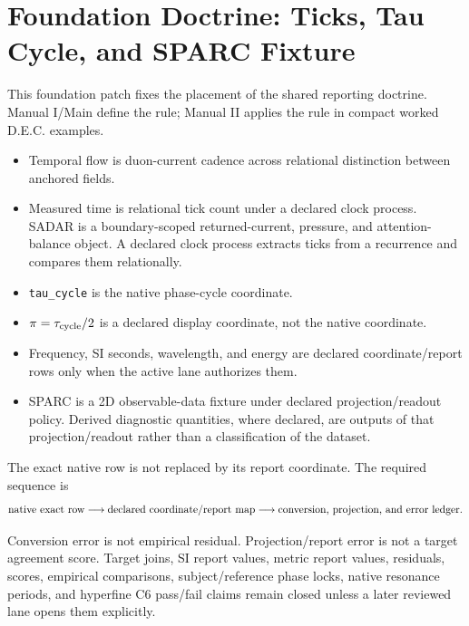 
\section{Foundation Doctrine: Ticks, Tau Cycle, and SPARC Fixture}

This foundation patch fixes the placement of the shared reporting doctrine.  Manual I/Main define the rule; Manual II applies the rule in compact worked D.E.C. examples.

\begin{itemize}
\item Temporal flow is duon-current cadence across relational distinction between anchored fields.
\item Measured time is relational tick count under a declared clock process. SADAR is a boundary-scoped returned-current, pressure, and attention-balance object. A declared clock process extracts ticks from a recurrence and compares them relationally.
\item \texttt{tau\_cycle} is the native phase-cycle coordinate.
\item \(\pi = \tau_{\rm cycle}/2\) is a declared display coordinate, not the native coordinate.
\item Frequency, SI seconds, wavelength, and energy are declared coordinate/report rows only when the active lane authorizes them.
\item SPARC is a 2D observable-data fixture under declared projection/readout policy. Derived diagnostic quantities, where declared, are outputs of that projection/readout rather than a classification of the dataset.
\end{itemize}

The exact native row is not replaced by its report coordinate.  The required sequence is
\[
\hbox{native exact row}\longrightarrow
\hbox{declared coordinate/report map}\longrightarrow
\hbox{conversion, projection, and error ledger}.
\]

Conversion error is not empirical residual.  Projection/report error is not a target agreement score.  Target joins, SI report values, metric report values, residuals, scores, empirical comparisons, subject/reference phase locks, native resonance periods, and hyperfine C6 pass/fail claims remain closed unless a later reviewed lane opens them explicitly.
